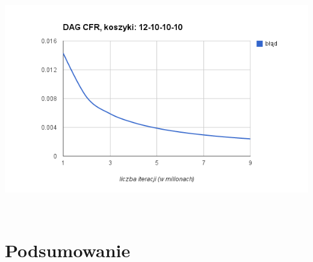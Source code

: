 \documentclass[licencjacka]{pracamgr}
\begin{document}
\includegraphics[scale=0.7]{wykres-dag-12.png}


$\,$ \\

\chapter{Podsumowanie}

 
 
\end{document}
